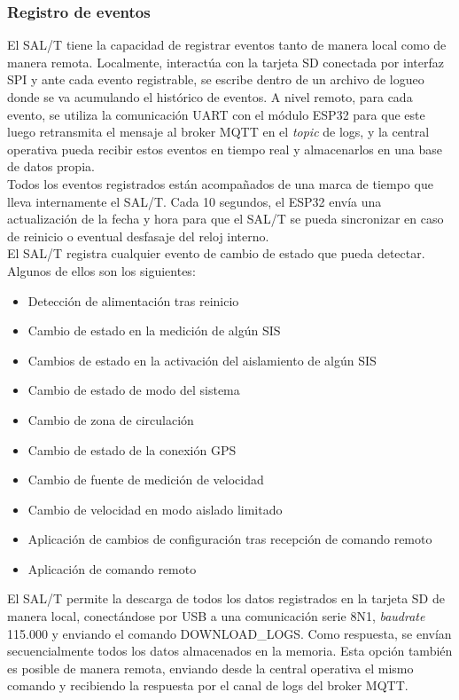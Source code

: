 \subsubsection{Registro de eventos}

El SAL/T tiene la capacidad de registrar eventos tanto de manera local como de manera remota. Localmente, interactúa con la tarjeta SD conectada por interfaz SPI y ante cada evento registrable, se escribe dentro de un archivo de logueo donde se va acumulando el histórico de eventos. A nivel remoto, para cada evento, se utiliza la comunicación UART con el módulo ESP32 para que este luego retransmita el mensaje al broker MQTT en el \textit{topic} de logs, y la central operativa pueda recibir estos eventos en tiempo real y almacenarlos en una base de datos propia. \\

Todos los eventos registrados están acompañados de una marca de tiempo que lleva internamente el SAL/T. Cada 10 segundos, el ESP32 envía una actualización de la fecha y hora para que el SAL/T se pueda sincronizar en caso de reinicio o eventual desfasaje del reloj interno. \\ 

El SAL/T registra cualquier evento de cambio de estado que pueda detectar. Algunos de ellos son los siguientes: 
\begin{itemize}
    \item Detección de alimentación tras reinicio
    \item Cambio de estado en la medición de algún SIS
    \item Cambios de estado en la activación del aislamiento de algún SIS
    \item Cambio de estado de modo del sistema
    \item Cambio de zona de circulación
    \item Cambio de estado de la conexión GPS
    \item Cambio de fuente de medición de velocidad
    \item Cambio de velocidad en modo aislado limitado    
    \item Aplicación de cambios de configuración tras recepción de comando remoto
    \item Aplicación de comando remoto
\end{itemize}

El SAL/T permite la descarga de todos los datos registrados en la tarjeta SD de manera local, conectándose por USB a una comunicación serie 8N1, \textit{baudrate} 115.000 y enviando el comando DOWNLOAD\_LOGS. Como respuesta, se envían secuencialmente todos los datos almacenados en la memoria. Esta opción también es posible de manera remota, enviando desde la central operativa el mismo comando y recibiendo la respuesta por el canal de logs del broker MQTT. 